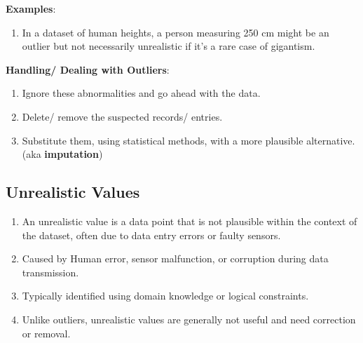 \vspace{0.3cm}

\textbf{Examples}:
\begin{enumerate}
    \item In a dataset of human heights, a person measuring 250 cm might be an outlier but not necessarily unrealistic if it’s a rare case of gigantism. \cite{common/online/chatgpt}
\end{enumerate}


\vspace{0.3cm}
\textbf{Handling/ Dealing with Outliers}:
\begin{enumerate}
    \item Ignore these abnormalities and go ahead with the data. \cite{statistics/book/Statistics-for-Data-Scientists/Maurits-Kaptein}

    \item Delete/ remove the suspected records/ entries. \cite{statistics/book/Statistics-for-Data-Scientists/Maurits-Kaptein}

    \item Substitute them, using statistical methods, with a more plausible alternative. (aka \textbf{imputation}) \cite{statistics/book/Statistics-for-Data-Scientists/Maurits-Kaptein}\label{Data/Outliers/imputation}
\end{enumerate}




\subsection{Unrealistic Values \cite{statistics/book/Statistics-for-Data-Scientists/Maurits-Kaptein}}\label{Data/Measurement-Levels/Unrealistic Values}

\begin{enumerate}
    \item An unrealistic value is a data point that is not plausible within the context of the dataset, often due to data entry errors or faulty sensors. \cite{common/online/chatgpt}

    \item Caused by Human error, sensor malfunction, or corruption during data transmission. \cite{common/online/chatgpt}

    \item Typically identified using domain knowledge or logical constraints. \cite{common/online/chatgpt}

    \item Unlike outliers, unrealistic values are generally not useful and need correction or removal. \cite{common/online/chatgpt}

\end{enumerate}


